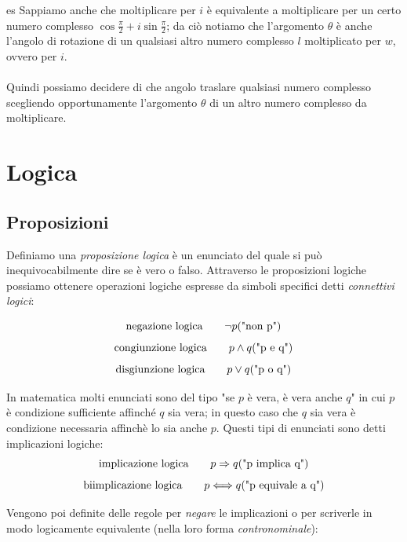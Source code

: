 \documentclass[x11names]{article}
\begin{document}
\begin{center}
{\begin{minipage}{5.75in}
\begin{blues}{es}
					Sappiamo anche che moltiplicare per $i$ è equivalente a moltiplicare per un certo numero complesso $\cos{\frac{\pi}{2}} + i\sin{\frac{\pi}{2}}$; da ciò notiamo che l'argomento $\theta$ è anche l'angolo di rotazione di un qualsiasi altro numero complesso $l$ moltiplicato per $w$, ovvero per $i$.
					\\\\
					Quindi possiamo decidere di che angolo traslare qualsiasi numero complesso scegliendo opportunamente l'argomento $\theta$ di un altro numero complesso da moltiplicare.
				\end{blues}
		\end{minipage}}        
	\end{center}
	
	\newpage
	\section{Logica}
	\subsection{Proposizioni}
	Definiamo una \textit{proposizione logica} è un enunciato del quale si può inequivocabilmente dire  se  è vero o falso. Attraverso le proposizioni logiche possiamo ottenere operazioni logiche espresse da simboli specifici detti \textit{connettivi logici}: 
	
	\[
	\text{negazione logica}\qquad    \neg p \text{("non p")}\\ \\
	\]
	\[
	\text{congiunzione logica}\qquad   p \wedge q  \text{("p e q")}\\ 
	\]
	\[
	\text{disgiunzione logica}\qquad   p \vee q  \text{("p o q")}\\ 
	\]
	
	\vspace{0.7em}
	\noindent
	In matematica molti enunciati sono del tipo "se $p$ è vera, è vera anche $q$" in cui $p$ è condizione sufficiente affinché $q$ sia vera; in questo caso che $q$ sia vera è condizione necessaria affinchè lo sia anche $p$. Questi tipi di enunciati sono detti implicazioni logiche:
	\[
	\text{implicazione logica}\qquad   p \Rightarrow q  \text{("p implica q")}\\ 
	\]
	\[
	\text{biimplicazione logica}\qquad   p \Longleftrightarrow q  \text{("p equivale a q")}\\ 
	\]
	
	\vspace{0.7em}
	\noindent
	Vengono poi definite delle regole per \textit{negare} le implicazioni o per scriverle in modo logicamente equivalente (nella loro forma \textit{contronominale}):
	
\end{document}
